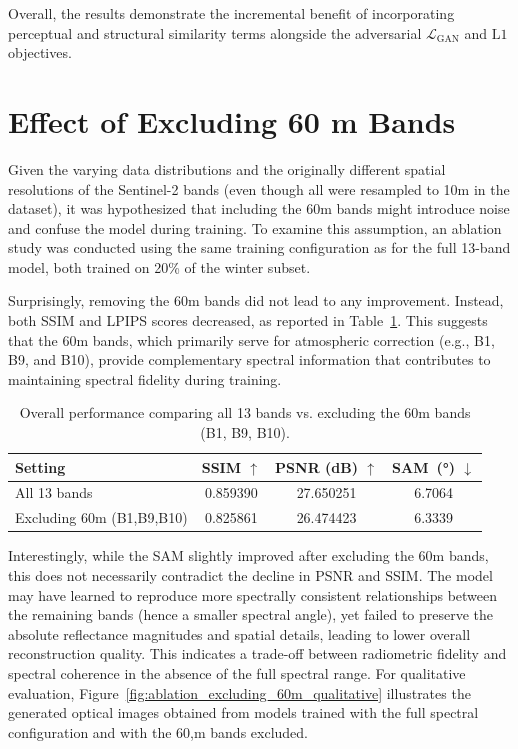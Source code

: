 Overall, the results demonstrate the incremental benefit of incorporating perceptual and structural similarity terms alongside the adversarial $\mathcal{L}_{\text{GAN}}$ and $\mathrm{L1}$ objectives. 

\section{Effect of Excluding 60 m Bands}
Given the varying data distributions and the originally different spatial resolutions of the Sentinel-2 bands (even though all were resampled to 10m in the dataset), it was hypothesized that including the 60m bands might introduce noise and confuse the model during training. To examine this assumption, an ablation study was conducted using the same training configuration as for the full 13-band model, both trained on 20\% of the winter subset.

Surprisingly, removing the 60m bands did not lead to any improvement. Instead, both SSIM and LPIPS scores decreased, as reported in Table~\ref{tab:ablation_excluding_60m}. This suggests that the 60m bands, which primarily serve for atmospheric correction (e.g., B1, B9, and B10), provide complementary spectral information that contributes to maintaining spectral fidelity during training.

\begin{table}[h!]
    \centering
    \setlength{\tabcolsep}{8pt}
    \renewcommand{\arraystretch}{1.15}
    \caption[Overall performance when excluding 60m bands]{Overall performance comparing all 13 bands vs. excluding the 60m bands (B1, B9, B10).}
    \label{tab:ablation_excluding_60m}
    \begin{tabular}{lccc}
        \hline
        \textbf{Setting} & \textbf{SSIM $\uparrow$} & \textbf{PSNR (dB) $\uparrow$} & \textbf{SAM~(°) $\downarrow$} \\
        \hline
        All 13 bands & 0.859390 & 27.650251 & 6.7064 \\
        Excluding 60m (B1,B9,B10) & 0.825861 & 26.474423 & 6.3339 \\
        \hline
    \end{tabular}
\end{table}

Interestingly, while the SAM slightly improved after excluding the 60m bands, this does not necessarily contradict the decline in PSNR and SSIM. The model may have learned to reproduce more spectrally consistent relationships between the remaining bands (hence a smaller spectral angle), yet failed to preserve the absolute reflectance magnitudes and spatial details, leading to lower overall reconstruction quality. This indicates a trade-off between radiometric fidelity and spectral coherence in the absence of the full spectral range. For qualitative evaluation, Figure~\ref{fig:ablation_excluding_60m_qualitative} illustrates the generated optical images obtained from models trained with the full spectral configuration and with the 60,m bands excluded.

